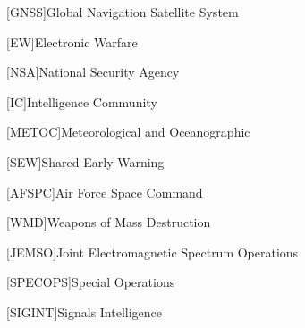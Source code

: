 [GNSS]{Global Navigation Satellite System}

[EW]{Electronic Warfare}

[NSA]{National Security Agency}

[IC]{Intelligence Community}

[METOC]{Meteorological and Oceanographic}

[SEW]{Shared Early Warning}

[AFSPC]{Air Force Space Command}

[WMD]{Weapons of Mass Destruction}

[JEMSO]{Joint Electromagnetic Spectrum Operations}

[SPECOPS]{Special Operations}

[SIGINT]{Signals Intelligence}
